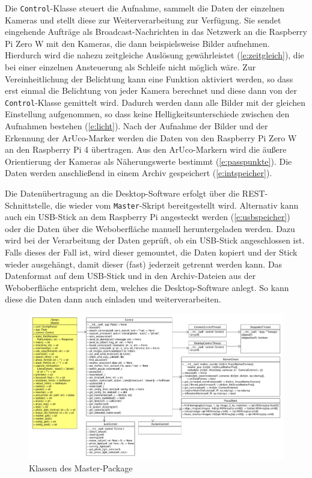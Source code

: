 \documentclass[./00PhotoBox.tex]{subfiles}
\begin{document}
Die \texttt{Control}-Klasse steuert die Aufnahme, sammelt die Daten der einzelnen Kameras und stellt diese zur Weiterverarbeitung zur Verfügung. Sie sendet eingehende Aufträge als Broadcast-Nachrichten in das Netzwerk an die Raspberry Pi Zero W mit den Kameras, die dann beispielsweise Bilder aufnehmen. Hierdurch wird die nahezu zeitgleiche Auslösung gewährleistet (\autoref{e:zeitgleich}), die bei einer einzelnen Ansteuerung als Schleife nicht möglich wäre. Zur Vereinheitlichung der Belichtung kann eine Funktion aktiviert werden, so dass erst einmal die Belichtung von jeder Kamera berechnet und diese dann von der \texttt{Control}-Klasse gemittelt wird. Dadurch werden dann alle Bilder mit der gleichen Einstellung aufgenommen, so dass keine Helligkeitsunterschiede zwischen den Aufnahmen bestehen (\autoref{e:licht}).
Nach der Aufnahme der Bilder und der Erkennung der ArUco-Marker werden die Daten von den Raspberry Pi Zero W an den Raspberry Pi 4 übertragen. Aus den ArUco-Markern wird die äußere Orientierung der Kameras als Näherungswerte bestimmt (\autoref{e:passpunkte}). Die Daten werden anschließend in einem Archiv gespeichert (\autoref{e:intspeicher}).

Die Datenübertragung an die Desktop-Software erfolgt über die REST-Schnittstelle, die wieder vom \texttt{Master}-Skript bereitgestellt wird. Alternativ kann auch ein USB-Stick an dem Raspberry Pi angesteckt werden (\autoref{e:usbspeicher}) oder die Daten über die Weboberfläche manuell heruntergeladen werden. Dazu wird bei der Verarbeitung der Daten geprüft, ob ein USB-Stick angeschlossen ist. Falls dieses der Fall ist, wird dieser gemountet, die Daten kopiert und der Stick wieder ausgehängt, damit dieser (fast) jederzeit getrennt werden kann. Das Datenformat auf dem USB-Stick und in den Archiv-Dateien aus der Weboberfläche entspricht dem, welches die Desktop-Software anlegt. So kann diese die Daten dann auch einladen und weiterverarbeiten.

\begin{figure}
  \centering
  \includegraphics[width=1\textwidth]{./img/uml/uml_master_classdiagramm.pdf}
  \caption{Klassen des Master-Package} %
  \label{img:master} %
\end{figure}
\end{document}
